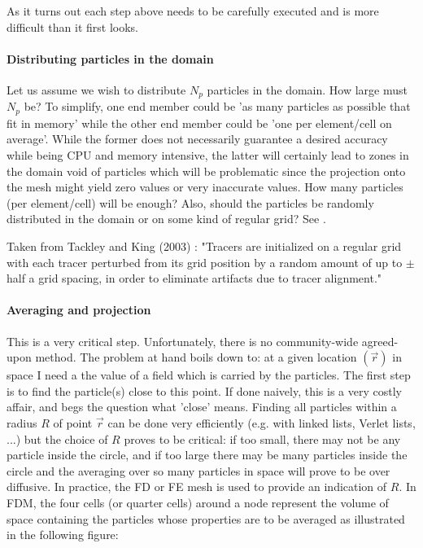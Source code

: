 As it turns out each step above needs to be carefully executed and is more difficult 
than it first looks. 

\paragraph{Distributing particles in the domain} 
Let us assume we wish to distribute $N_p$ particles
in the domain. How large must $N_p$ be? To simplify, one end member could be 'as many particles as possible that fit in memory' 
while the other end member could be 'one per element/cell on average'. While the former does not necessarily guarantee a 
desired accuracy while being CPU and memory intensive, the latter will certainly lead to zones in the domain void 
of particles which will be problematic since the projection onto the mesh might yield zero values or very inaccurate values.
How many particles (per element/cell) will be enough?
Also, should the particles be randomly distributed in the domain or on some kind of regular grid? 
See .

Taken from Tackley and King (2003) \cite{taki03}: "Tracers are initialized on a regular grid 
with each tracer perturbed from its grid position by a random amount of up to
$\pm$ half a grid spacing, in order to eliminate artifacts due to tracer alignment."


\paragraph{Averaging and projection} 
This is a very critical step. Unfortunately, there is no community-wide
agreed-upon method. The problem at hand boils down to: at a given location $(\vec r)$ in space I need a
the value of a field which is carried by the particles. 
The first step is to find the particle(s) close to this point. If done naively, this is a very costly affair, 
and begs the question what 'close' means. Finding all particles within a radius $R$ of point $\vec r$ can 
be done very efficiently (e.g. with linked lists, Verlet lists, ...) but the choice 
of $R$ proves to be critical:
if too small, there may not be any particle inside the circle, and if too large there may be many particles 
inside the circle and the averaging over so many particles in space will prove to be over diffusive. 
In practice, the FD or FE mesh is used to provide an indication of $R$. 
In FDM, the four cells (or quarter cells) around
a node represent the volume of space containing the particles whose properties are to be averaged \cite{dumg11} 
as illustrated in the following figure:

